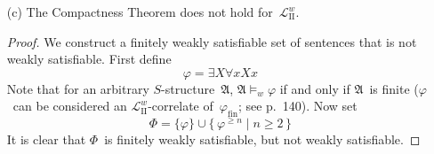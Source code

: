 \documentclass[letterpaper]{article}
\newcommand{\I}{\mathfrak{I}}
\newcommand{\free}{\mathrm{free}}
\newcommand{\union}{\cup}
\newcommand{\A}{\mathfrak{A}}
\renewcommand{\L}{\mathcal{L}}
\newcommand{\Ls}{\L_{\mathrm{II}}}
\newcommand{\Lsw}{\Ls^w}
\theoremstyle{remark}
\begin{document}
\begin{enumerate}
\begin{proof}
Finally, suppose $\varphi=\exists X^n\varphi'$, and let $\psi'$~correspond to~$\varphi'$ by the induction hypothesis. We make use of a formula~$\gamma(X^n)$ which states that $X^n$~is finite ($\gamma$~states that all injective functions on~$X^n$ are surjective; see p.~140). We set $\psi=\exists X^n(\gamma(X^n)\land\psi')$. Then $\free(\varphi)=\free(\psi)$ and, for all~$\I$,
\begin{align*}
&\I\models_w\exists X^n\varphi'&&\text{iff}&&\text{there exists a finite $C\subseteq A^n$ such that $\I\tfrac{C}{X^n}\models_w\varphi'$}\\
    &&&\text{iff}&&\text{there exists a $C\subseteq A^n$ such that $\I\tfrac{C}{X^n}\models\gamma(X^n)$ and $\I\tfrac{C}{X^n}\models\psi'$}\\
    &&&\text{iff}&&\text{there exists a $C\subseteq A^n$ such that $\I\tfrac{C}{X^n}\models(\gamma(X^n)\land\psi')$}\\
    &&&\text{iff}&&\I\models\psi
\end{align*}
This completes the proof of our stronger claim. The original exercise is an immediate corollary.
\end{proof}
\item[(c)] The Compactness Theorem does not hold for~$\Lsw$.
\begin{proof}
We construct a finitely weakly satisfiable set of sentences that is not weakly satisfiable. First define
$$\varphi=\exists X\forall x Xx$$
Note that for an arbitrary $S$-structure~$\A$, $\A\models_w\varphi$ if and only if $\A$~is finite ($\varphi$~can be considered an $\Lsw$-correlate of~$\varphi_{\mathrm{fin}}$; see p.~140). Now set
$$\Phi=\{\varphi\}\union\{\,\varphi^{\ge n}\mid n\ge 2\,\}$$
It is clear that $\Phi$~is finitely weakly satisfiable, but not weakly satisfiable.
\end{proof}
\end{enumerate}
\end{document}
